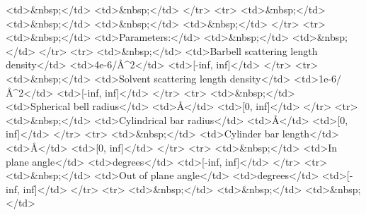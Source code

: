 \textless{}td\textgreater{}\&nbsp;\textless{}/td\textgreater{} \textless{}td\textgreater{}\&nbsp;\textless{}/td\textgreater{} \textless{}/tr\textgreater{} \textless{}tr\textgreater{} \textless{}td\textgreater{}\&nbsp;\textless{}/td\textgreater{} \textless{}td\textgreater{}\&nbsp;\textless{}/td\textgreater{} \textless{}td\textgreater{}\&nbsp;\textless{}/td\textgreater{} \textless{}td\textgreater{}\&nbsp;\textless{}/td\textgreater{} \textless{}/tr\textgreater{} \textless{}tr\textgreater{} \textless{}td\textgreater{}\&nbsp;\textless{}/td\textgreater{} \textless{}td\textgreater{}Parameters:\textless{}/td\textgreater{} \textless{}td\textgreater{}\&nbsp;\textless{}/td\textgreater{} \textless{}td\textgreater{}\&nbsp;\textless{}/td\textgreater{} \textless{}/tr\textgreater{} \textless{}tr\textgreater{} \textless{}td\textgreater{}\&nbsp;\textless{}/td\textgreater{} \textless{}td\textgreater{}Barbell scattering length density\textless{}/td\textgreater{} \textless{}td\textgreater{}4e-6/\AA{}\textasciicircum{}2\textless{}/td\textgreater{} \textless{}td\textgreater{}[-inf, inf]\textless{}/td\textgreater{} \textless{}/tr\textgreater{} \textless{}tr\textgreater{} \textless{}td\textgreater{}\&nbsp;\textless{}/td\textgreater{} \textless{}td\textgreater{}Solvent scattering length density\textless{}/td\textgreater{} \textless{}td\textgreater{}1e-6/\AA{}\textasciicircum{}2\textless{}/td\textgreater{} \textless{}td\textgreater{}[-inf, inf]\textless{}/td\textgreater{} \textless{}/tr\textgreater{} \textless{}tr\textgreater{} \textless{}td\textgreater{}\&nbsp;\textless{}/td\textgreater{} \textless{}td\textgreater{}Spherical bell radius\textless{}/td\textgreater{} \textless{}td\textgreater{}\AA{}\textless{}/td\textgreater{} \textless{}td\textgreater{}[0, inf]\textless{}/td\textgreater{} \textless{}/tr\textgreater{} \textless{}tr\textgreater{} \textless{}td\textgreater{}\&nbsp;\textless{}/td\textgreater{} \textless{}td\textgreater{}Cylindrical bar radius\textless{}/td\textgreater{} \textless{}td\textgreater{}\AA{}\textless{}/td\textgreater{} \textless{}td\textgreater{}[0, inf]\textless{}/td\textgreater{} \textless{}/tr\textgreater{} \textless{}tr\textgreater{} \textless{}td\textgreater{}\&nbsp;\textless{}/td\textgreater{} \textless{}td\textgreater{}Cylinder bar length\textless{}/td\textgreater{} \textless{}td\textgreater{}\AA{}\textless{}/td\textgreater{} \textless{}td\textgreater{}[0, inf]\textless{}/td\textgreater{} \textless{}/tr\textgreater{} \textless{}tr\textgreater{} \textless{}td\textgreater{}\&nbsp;\textless{}/td\textgreater{} \textless{}td\textgreater{}In plane angle\textless{}/td\textgreater{} \textless{}td\textgreater{}degrees\textless{}/td\textgreater{} \textless{}td\textgreater{}[-inf, inf]\textless{}/td\textgreater{} \textless{}/tr\textgreater{} \textless{}tr\textgreater{} \textless{}td\textgreater{}\&nbsp;\textless{}/td\textgreater{} \textless{}td\textgreater{}Out of plane angle\textless{}/td\textgreater{} \textless{}td\textgreater{}degrees\textless{}/td\textgreater{} \textless{}td\textgreater{}[-inf, inf]\textless{}/td\textgreater{} \textless{}/tr\textgreater{} \textless{}tr\textgreater{} \textless{}td\textgreater{}\&nbsp;\textless{}/td\textgreater{} \textless{}td\textgreater{}\&nbsp;\textless{}/td\textgreater{} \textless{}td\textgreater{}\&nbsp;\textless{}/td\textgreater{} 